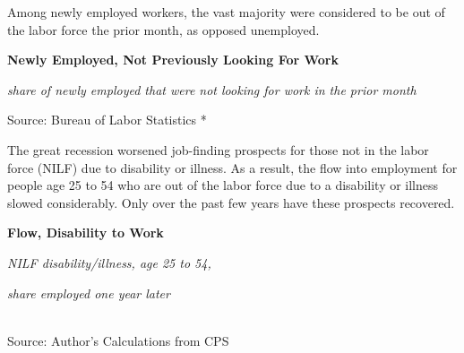 \documentclass{report}
\makeatletter
\newcommand{\tbllink}[1]{\href{https://raw.githubusercontent.com/bdecon/US-chartbook/master/chartbook/data/#1}{\faTable}}
\newcommand*\short[1]{\expandafter\@gobbletwo\number\numexpr#1\relax}
\newcommand{\dateaxisticks}{
		date coordinates in=x, axis line style={draw=none},
		xmax={2020-08-10},
		max space between ticks=40,	    
		xtick={{1990-01-01}, {1992-01-01}, {1994-01-01}, 
			{1996-01-01}, {1998-01-01}, {2000-01-01}, 
			{2002-01-01}, {2004-01-01}, {2006-01-01},
			{2008-01-01}, {2010-01-01}, {2012-01-01}, {2014-01-01},
		    {2016-01-01}, {2018-01-01}, {2020-01-01}},
		minor xtick={{1989-01-01}, {1991-01-01}, {1993-01-01},
			{1995-01-01}, {1997-01-01}, {1999-01-01}, 
			{2001-01-01}, {2003-01-01}, {2005-01-01}, {2007-01-01},
		    {2009-01-01}, {2011-01-01}, {2013-01-01}, {2015-01-01},
		    {2017-01-01}, {2019-01-01}},
		enlarge y limits={0.06}, enlarge x limits={0.01},
		}
\newcommand{\shdateaxisticks}{
		date coordinates in=x, axis line style={draw=none},
		xmax={2021-01-01},
		max space between ticks=40,	    
		xtick={{1990-01-01}, {1995-01-01}, {2000-01-01}, 
			{2005-01-01}, {2010-01-01}, {2015-01-01}, {2020-01-01}},
		minor xtick={},
		enlarge y limits={0.06}, enlarge x limits={0.01},
		}
\newcommand{\bbar}[2]{extra #1 ticks = {{#2}}, extra #1 tick labels = ,
		extra #1 tick style = {grid=major, grid style={thick, black!25}},}
\newcommand{\stdline}[4]{\addplot[very thick, no markers, color=#1] 
		table [x=#2, y=#3, col sep=comma] {#4};	}
\newcommand{\rbars}{
		\fill[color=black!10] (axis cs:{1990-07-01},\pgfkeysvalueof{/pgfplots/ymin}) rectangle 
			(axis cs:{1991-03-01}, \pgfkeysvalueof{/pgfplots/ymax});
		\fill[color=black!10] (axis cs:{2007-12-01},\pgfkeysvalueof{/pgfplots/ymin}) rectangle 
			(axis cs:{2009-07-01}, \pgfkeysvalueof{/pgfplots/ymax});
		\fill[color=black!10] (axis cs:{2001-03-01},\pgfkeysvalueof{/pgfplots/ymin}) rectangle 
			(axis cs:{2001-11-01}, \pgfkeysvalueof{/pgfplots/ymax});
		\fill[color=black!10] (axis cs:{2020-02-01},\pgfkeysvalueof{/pgfplots/ymin}) rectangle 
			(axis cs:{2020-09-01}, \pgfkeysvalueof{/pgfplots/ymax});}
\newcommand{\rebars}{
		\fill[color=black!10] (axis cs:{2007-12-01},\pgfkeysvalueof{/pgfplots/ymin}) rectangle 
			(axis cs:{2009-07-01}, \pgfkeysvalueof{/pgfplots/ymax});
		\fill[color=black!10] (axis cs:{2001-03-01},\pgfkeysvalueof{/pgfplots/ymin}) rectangle 
			(axis cs:{2001-11-01}, \pgfkeysvalueof{/pgfplots/ymax});
		\fill[color=black!10] (axis cs:{2020-02-01},\pgfkeysvalueof{/pgfplots/ymin}) rectangle 
			(axis cs:{2020-09-01}, \pgfkeysvalueof{/pgfplots/ymax});}
\makeatother
\begin{document}
{{{{{{{{{\begin{minipage}{0.76\textwidth}
Among newly employed workers, the vast majority were considered to be out of the labor force the prior month, as opposed unemployed.  

\vspace{4mm}

\normalsize \textbf{Newly Employed, Not Previously Looking For Work}

\footnotesize{\textit{share of newly employed that were not looking for work in the prior month}}

\hspace*{-2mm} 

\footnotesize{Source: Bureau of Labor Statistics} \hfill \tbllink{lf_flow.csv}*

\end{minipage}

\vspace{5mm}

\begin{minipage}{0.32\textwidth}
\small The great recession worsened job-finding prospects for those not in the labor force (NILF) due to disability or illness. As a result, the flow into employment for people age 25 to 54 who are out of the labor force due to a disability or illness slowed considerably. Only over the past few years have these prospects recovered. 
\end{minipage} \hspace{5mm} \begin{minipage}{0.4\textwidth}
\normalsize \textbf{Flow, Disability to Work}

\footnotesize{\textit{NILF disability/illness, age 25 to 54,}}

\footnotesize{\textit{share employed one year later}}

\hspace*{-2mm} \\
\footnotesize{Source: Author's Calculations from CPS} \hfill \tbllink{disflow.csv}
\end{minipage}

}}}}}}}}}
\end{document}
